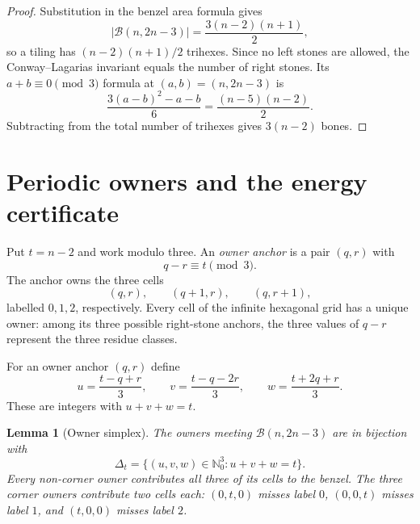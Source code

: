 \documentclass[11pt]{amsart}
\newtheorem{lemma}[theorem]{Lemma}
\theoremstyle{definition}
\newcommand{\Bz}{\mathcal B}
\begin{document}
\begin{proof}
Substitution in the benzel area formula gives
\[
 |\Bz(n,2n-3)|=\frac{3(n-2)(n+1)}2,
\]
so a tiling has $(n-2)(n+1)/2$ trihexes.  Since no left stones are allowed,
the Conway--Lagarias invariant equals the number of right stones.  Its
$a+b\equiv0\pmod3$ formula at $(a,b)=(n,2n-3)$ is
\[
 \frac{3(a-b)^2-a-b}{6}
 =\frac{(n-5)(n-2)}2.
\]
Subtracting from the total number of trihexes gives $3(n-2)$ bones.
\end{proof}

\section{Periodic owners and the energy certificate}

Put $t=n-2$ and work modulo three.  An \emph{owner anchor} is a pair
$(q,r)$ with
\[
 q-r\equiv t\pmod3.
\]
The anchor owns the three cells
\[
 (q,r),\qquad(q+1,r),\qquad(q,r+1),
\]
labelled $0,1,2$, respectively.  Every cell of the infinite hexagonal grid
has a unique owner: among its three possible right-stone anchors, the three
values of $q-r$ represent the three residue classes.

For an owner anchor $(q,r)$ define
\begin{equation}\label{eq:owner-coordinates}
 u=\frac{t-q+r}{3},\qquad
 v=\frac{t-q-2r}{3},\qquad
 w=\frac{t+2q+r}{3}.
\end{equation}
These are integers with $u+v+w=t$.

\begin{lemma}[Owner simplex]\label{lem:owner-simplex}
The owners meeting $\Bz(n,2n-3)$ are in bijection with
\[
 \Delta_t=\{(u,v,w)\in\mathbb N_0^3:u+v+w=t\}.
\]
Every non-corner owner contributes all three of its cells to the benzel.  The
three corner owners contribute two cells each: $(0,t,0)$ misses label $0$,
$(0,0,t)$ misses label $1$, and $(t,0,0)$ misses label $2$.
\end{lemma}
\end{document}
